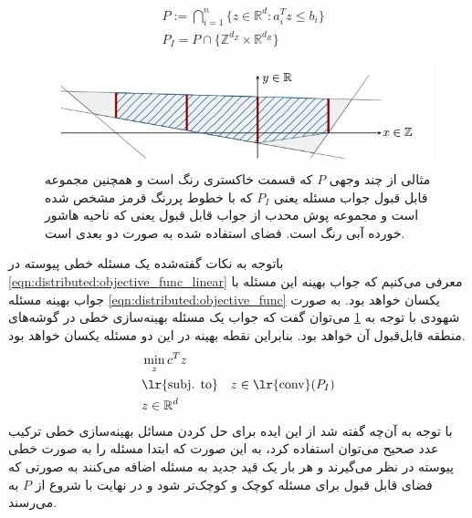 \begin{align}
	&P := \bigcap_{i=1}^n \{ z \in \mathbb{R}^d : a_i^Tz \le b_i\} \label{eqn:distributed:constraint_cont} \\
	&P_I = P \cap \{\mathbb{Z}^{d_Z} \times \mathbb{R}^{d_R}\} \label{eqn:distributed:constraint_int}
\end{align}	

\begin{figure}[h]
	\centerline{\includegraphics[width=15cm]{graphics/4-heuristic-dist/polyhedron}}
	\caption{مثالی از چند وجهی $P$ که قسمت خاکستری رنگ است و همچنین مجموعه قابل قبول جواب مسئله یعنی $P_I$ که با خطوط پررنگ قرمز مشخص شده است و مجموعه پوش محدب از جواب قابل قبول یعنی  که ناحیه هاشور خورده آبی رنگ است. فضای استفاده شده به صورت دو بعدی است.}
	\label{fig:distributed:polyhedron}
\end{figure}
	باتوجه به نکات گفته‌شده یک مسئله خطی پیوسته در \cref{eqn:distributed:objective_func_linear} معرفی می‌کنیم که جواب بهینه‌ این مسئله با جواب بهینه مسئله \cref{eqn:distributed:objective_func} یکسان خواهد بود. به صورت شهودی با توجه به \cref{fig:distributed:polyhedron} می‌توان گفت که جواب یک مسئله بهینه‌سازی خطی در گوشه‌های منطقه‌ قابل‌قبول آن خواهد بود. بنابراین نقطه بهینه در این دو مسئله یکسان خواهد بود. 
	\begin{align}\label{eqn:distributed:objective_func_linear}
	&\min_{z}c^Tz \notag \\
	&\text{\lr{subj. to}} \quad z \in \text{\lr{conv}}(P_I) \notag \\
	&z \in \mathbb{R}^d
	\end{align}
	با توجه به آن‌چه گفته شد از این ایده برای حل کردن مسائل بهینه‌سازی خطی ترکیب عدد صحیح می‌توان استفاده کرد، به این صورت که ابتدا مسئله را به صورت خطی پیوسته در نظر می‌گیرند و هر بار یک قید جدید به مسئله اضافه می‌کنند به صورتی که فضای قابل قبول برای مسئله کوچک و کوچک‌تر شود و در نهایت با شروع از $P$ به  می‌رسند. 
	
